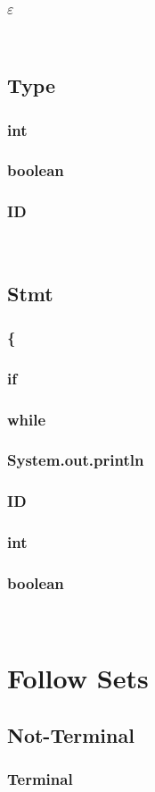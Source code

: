 \documentclass{report}
\begin{document}
\begin{multicols}{3}
\subsubsection*{$\varepsilon$}
\ 

\subsection*{Type}
\subsubsection*{int}
\subsubsection*{boolean}
\subsubsection*{ID}
\ 

\subsection*{Stmt}
\subsubsection*{\{ }
\subsubsection*{if}
\subsubsection*{while}
\subsubsection*{System.out.println}
\subsubsection*{ID}
\subsubsection*{int}
\subsubsection*{boolean}
\ 

\end{multicols}

\newpage

\section*{Follow Sets}

\begin{multicols}{3}

\subsection*{Not-Terminal}
\subsubsection*{Terminal}

\end{multicols}
\end{document}
